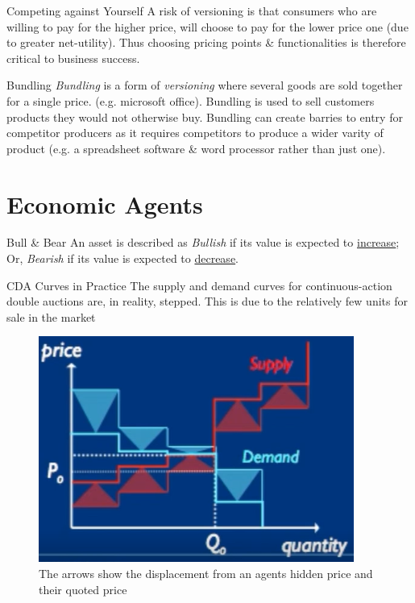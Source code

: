 \documentclass[11pt,a4paper]{article}
\begin{document}
\begin{proposition}{Competing against Yourself}
  A risk of versioning is that consumers who are willing to pay for the higher price, will choose to pay for the lower price one (due to greater net-utility). Thus choosing pricing points \& functionalities is therefore critical to business success.
\end{proposition}

\begin{proposition}{Bundling}
  \textit{Bundling} is a form of \textit{versioning} where several goods are sold together for a single price. (e.g. microsoft office). Bundling is used to sell customers products they would not otherwise buy. Bundling can create barries to entry for competitor producers as it requires competitors to produce a wider varity of product (e.g. a spreadsheet software \& word processor rather than just one).
\end{proposition}

\section{Economic Agents}

\begin{definition}{Bull \& Bear}
  An asset is described as \textit{Bullish} if its value is expected to \underline{increase}; Or, \textit{Bearish} if its value is expected to \underline{decrease}.
\end{definition}

\begin{remark}{CDA Curves in Practice}
  The supply and demand curves for continuous-action double auctions are, in reality, stepped. This is due to the relatively few units for sale in the market
\end{remark}

\begin{figure}[ht!]
  \centering
  \includegraphics[width=.3\textwidth]{quotedPrices.PNG}
  \caption{The arrows show the displacement from an agents hidden price and their quoted price}
\end{figure}
\end{document}
